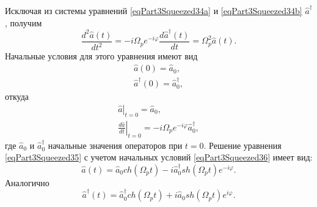 Исключая из системы уравнений \eqref{eqPart3Squeezed34a} и
\eqref{eqPart3Squeezed34b} $\hat{a}^{\dag}$, получим
\begin{equation}
\frac{d^2\hat{a}\left(t\right)}{dt^2} = 
- i \Omega_p e^{- i \varphi}
\frac{d\hat{a}^{\dag}\left(t\right)}{dt} = 
\Omega_p^2\hat{a}\left(t\right).
\label{eqPart3Squeezed35}
\end{equation}
Начальные условия для этого уравнения имеют вид
\begin{eqnarray}
\hat{a}\left(0\right) = \hat{a}_0, 
\nonumber \\
\hat{a}^{\dag}\left(0\right) = \hat{a}^{\dag}_0, 
\nonumber
\end{eqnarray}
откуда
\begin{eqnarray}
\left.\hat{a}\right|_{t=0} = \hat{a}_0, 
\nonumber \\
\left.\frac{d\hat{a}}{dt}\right|_{t=0} = 
- i \Omega_p e^{- i \varphi} \hat{a}^{\dag}_0,
\label{eqPart3Squeezed36}
\end{eqnarray}
где $\hat{a}_0$ и $\hat{a}^{\dag}_0$ начальные значения операторов при $t
= 0$. Решение уравнения \eqref{eqPart3Squeezed35} с учетом начальных
условий \eqref{eqPart3Squeezed36} имеет вид:
\begin{equation}
\hat{a}\left(t\right) = \hat{a}_0 ch \left(\Omega_p t \right) - 
i \hat{a}^{\dag}_0 sh \left(\Omega_p t\right) e^{-i \varphi}.
\label{eqPart3Squeezed37a}
\end{equation}
Аналогично
\begin{equation}
\hat{a}^{\dag}\left(t\right) = \hat{a}^{\dag}_0 ch \left(\Omega_p t \right) +
i \hat{a}_0 sh \left(\Omega_p t\right) e^{i \varphi}.
\label{eqPart3Squeezed37b}
\end{equation}



